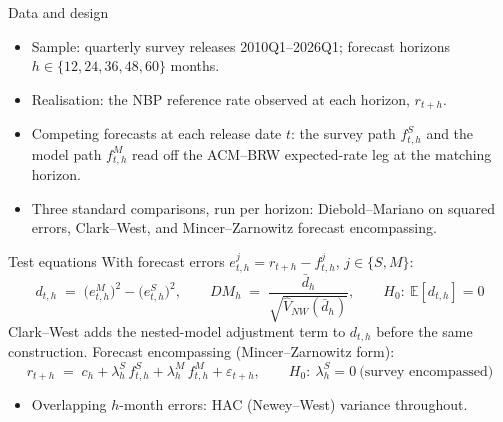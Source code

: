 \documentclass[aspectratio=169,11pt]{beamer}
\begin{document}
\begin{frame}{Data and design}
  \begin{itemize}
    \item Sample: quarterly survey releases 2010Q1--2026Q1; forecast horizons
          $h \in \{12, 24, 36, 48, 60\}$ months.
    \item Realisation: the NBP reference rate observed at each horizon,
          $r_{t+h}$.
    \item Competing forecasts at each release date $t$: the survey path
          $f^{S}_{t,h}$ and the model path $f^{M}_{t,h}$ read off the ACM--BRW
          expected-rate leg at the matching horizon.
    \item Three standard comparisons, run per horizon: Diebold--Mariano on
          squared errors, Clark--West, and Mincer--Zarnowitz forecast
          encompassing.
  \end{itemize}
\end{frame}

\begin{frame}{Test equations}
  \small With forecast errors $e^{j}_{t,h} = r_{t+h} - f^{j}_{t,h}$,
  $j \in \{S, M\}$:
  \[ d_{t,h} \;=\; \big(e^{M}_{t,h}\big)^2 - \big(e^{S}_{t,h}\big)^2,
     \qquad
     DM_h \;=\; \frac{\bar d_h}{\sqrt{\widehat V_{NW}(\bar d_h)}},
     \qquad H_0\!:\ \mathbb{E}[d_{t,h}]=0 \]
  Clark--West adds the nested-model adjustment term to $d_{t,h}$ before the
  same construction. Forecast encompassing (Mincer--Zarnowitz form):
  \[ r_{t+h} \;=\; c_h + \lambda^{S}_h\, f^{S}_{t,h}
     + \lambda^{M}_h\, f^{M}_{t,h} + \varepsilon_{t+h},
     \qquad H_0\!:\ \lambda^{S}_h = 0 \ \text{(survey encompassed)} \]
  \begin{itemize}
    \item Overlapping $h$-month errors: HAC (Newey--West) variance throughout.
  \end{itemize}
\end{frame}
\end{document}
